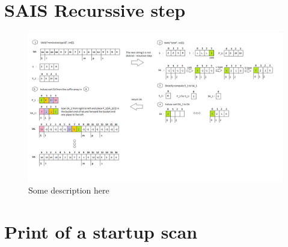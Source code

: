 \documentclass[12pt]{article} %
\begin{document}
\newpage
\section{SAIS Recurssive step}\label{SAIS Algorithm run}
\begin{figure}[H]
    \centering
    \includegraphics[width=1.1\textwidth]{SAIS_RECURSIVEDESCRIPTION}
    \captionsetup{width=0.8\textwidth}
    \caption{Some description here}
    \label{fig:SAIS_RECURSIVEDESCRIPTION}
\end{figure}
\newpage
\section{Print of a startup scan}

\nocite{*}



\end{document}
